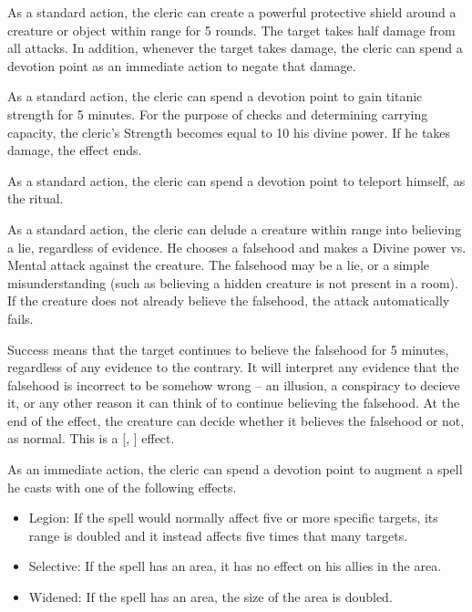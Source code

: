 As a standard action, the cleric can create a powerful protective shield around a creature or object within \rngclose range for 5 rounds.
The target takes half damage from all attacks.
In addition, whenever the target takes damage, the cleric can spend a devotion point as an immediate action to negate that damage.

As a standard action, the cleric can spend a devotion point to gain titanic strength for 5 minutes.
For the purpose of checks and determining carrying capacity, the cleric's Strength becomes equal to 10 \add his divine power.
If he takes damage, the effect ends.

As a standard action, the cleric can spend a devotion point to teleport himself, as the  ritual.

As a standard action, the cleric can delude a creature within \rngmed range into believing a lie, regardless of evidence.
He chooses a falsehood and makes a Divine power vs. Mental attack against the creature.
The falsehood may be a lie, or a simple misunderstanding (such as believing a hidden creature is not present in a room).
If the creature does not already believe the falsehood, the attack automatically fails.

Success means that the target continues to believe the falsehood for 5 minutes, regardless of any evidence to the contrary.
It will interpret any evidence that the falsehood is incorrect to be somehow wrong -- an illusion, a conspiracy to decieve it, or any other reason it can think of to continue believing the falsehood.
At the end of the effect, the creature can decide whether it believes the falsehood or not, as normal.
This is a [, ] effect.

As an immediate action, the cleric can spend a devotion point to augment a spell he casts with one of the following effects.
\begin{itemize}
    \item Legion: If the spell would normally affect five or more specific targets, its range is doubled and it instead affects five times that many targets.
    \item Selective: If the spell has an area, it has no effect on his allies in the area.
    \item Widened: If the spell has an area, the size of the area is doubled.
\end{itemize}

